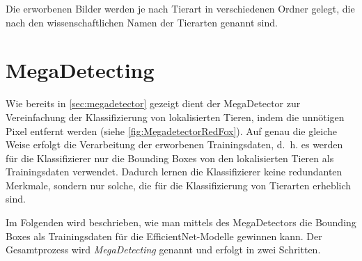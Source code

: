 
Die erworbenen Bilder werden je nach Tierart in verschiedenen Ordner gelegt, die nach den wissenschaftlichen Namen der Tierarten genannt sind.

\section{MegaDetecting}

Wie bereits in \autoref{sec:megadetector} gezeigt dient der MegaDetector zur Vereinfachung der Klassifizierung von lokalisierten Tieren, indem die unnötigen Pixel entfernt werden (siehe \autoref{fig:MegadetectorRedFox}). Auf genau die gleiche Weise erfolgt die Verarbeitung der erworbenen Trainingsdaten, d.~h. es werden für die Klassifizierer nur die Bounding Boxes von den lokalisierten Tieren als Trainingsdaten verwendet. Dadurch lernen die Klassifizierer keine redundanten Merkmale, sondern nur solche, die für die Klassifizierung von Tierarten erheblich sind.

Im Folgenden wird beschrieben, wie man mittels des MegaDetectors die Bounding Boxes als Trainingsdaten für die EfficientNet-Modelle gewinnen kann. Der Gesamtprozess wird \emph{MegaDetecting} genannt und erfolgt in zwei Schritten.

